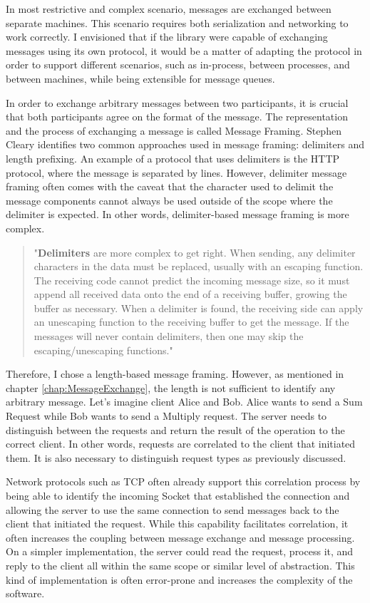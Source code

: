 \documentclass[10pt, conference, a4paper]{IEEEtran}
\begin{document}
In most restrictive and complex scenario, messages are exchanged between separate machines. 
This scenario requires both serialization and networking to work correctly. 
I envisioned that if the library were capable of exchanging messages using its own protocol, 
it would be a matter of adapting the protocol in order to support different scenarios, such as in-process, between processes, and between machines, while being extensible for message queues.

In order to exchange arbitrary messages between two participants, it is crucial that both participants agree on the format of the message. 
The representation and the process of exchanging a message is called Message Framing\parencite{MessageFraming}.
Stephen Cleary identifies two common approaches used in message framing: delimiters and length prefixing. 
An example of a protocol that uses delimiters is the HTTP protocol, where the message is separated by lines. 
However, delimiter message framing often comes with the caveat that the character used to delimit the message components cannot always be used outside of the scope where the delimiter is expected. 
In other words, delimiter-based message framing is more complex.

\begin{quote}
 "\textbf{Delimiters} are more complex to get right. When sending, any delimiter characters in the data must be replaced, usually with an escaping function. 
 The receiving code cannot predict the incoming message size, so it must append all received data onto the end of a receiving buffer, growing the buffer as necessary. 
 When a delimiter is found, the receiving side can apply an unescaping function to the receiving buffer to get the message. 
 If the messages will never contain delimiters, then one may skip the escaping/unescaping functions."
\end{quote}\parencite{MessageFraming}

Therefore, I chose a length-based message framing. 
However, as mentioned in chapter \ref{chap:MessageExchange}, the length is not sufficient to identify any arbitrary message. 
Let's imagine client Alice and Bob. Alice wants to send a Sum Request while Bob wants to send a Multiply request. 
The server needs to distinguish between the requests and return the result of the operation to the correct client. 
In other words, requests are correlated to the client that initiated them. It is also necessary to distinguish request types as previously discussed.

Network protocols such as TCP often already support this correlation process by being able to identify the incoming Socket that established the connection and allowing the server to use the same connection to send messages back to the client that initiated the request.
While this capability facilitates correlation, it often increases the coupling between message exchange and message processing. 
On a simpler implementation, the server could read the request, process it, and reply to the client all within the same scope or similar level of abstraction. 
This kind of implementation is often error-prone and increases the complexity of the software.
\end{document}
